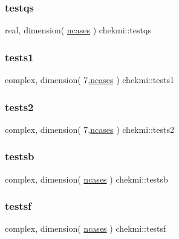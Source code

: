 \mbox{\label{namespacechekmi_a9451b9e1c1e024ed35194837847e73d3}} 
\subsubsection{\texorpdfstring{testqs}{testqs}}
{\footnotesize\ttfamily real, dimension( \hyperlink{namespacechekmi_a7a072a81d4a96e7c6d537baf67910952}{ncases} ) chekmi\+::testqs}

\mbox{\label{namespacechekmi_a72feac83354e1d6b12318bc4c4c78105}} 
\subsubsection{\texorpdfstring{tests1}{tests1}}
{\footnotesize\ttfamily complex, dimension( 7,\hyperlink{namespacechekmi_a7a072a81d4a96e7c6d537baf67910952}{ncases} ) chekmi\+::tests1}

\mbox{\label{namespacechekmi_ae467738ccccb2e776eab2a353e503a82}} 
\subsubsection{\texorpdfstring{tests2}{tests2}}
{\footnotesize\ttfamily complex, dimension( 7,\hyperlink{namespacechekmi_a7a072a81d4a96e7c6d537baf67910952}{ncases} ) chekmi\+::tests2}

\mbox{\label{namespacechekmi_abfd5fc456a9491beedef5d90b582317c}} 
\subsubsection{\texorpdfstring{testsb}{testsb}}
{\footnotesize\ttfamily complex, dimension( \hyperlink{namespacechekmi_a7a072a81d4a96e7c6d537baf67910952}{ncases} ) chekmi\+::testsb}

\mbox{\label{namespacechekmi_a8ec68fd14c1154b5c3bbd7433943536c}} 
\subsubsection{\texorpdfstring{testsf}{testsf}}
{\footnotesize\ttfamily complex, dimension( \hyperlink{namespacechekmi_a7a072a81d4a96e7c6d537baf67910952}{ncases} ) chekmi\+::testsf}

